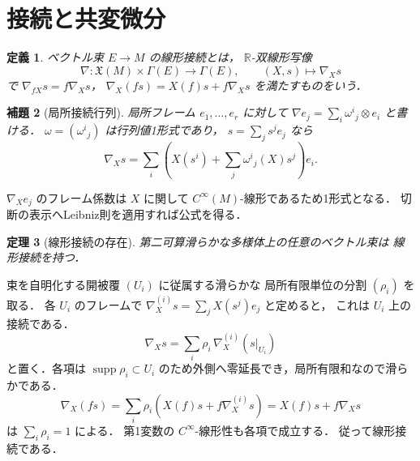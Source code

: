 \documentclass[a5paper,10pt,onecolumn]{jsarticle}
\makeatletter
\theoremstyle{mathnotetheorem}
\newtheorem{theorem}{定理}[section]
\newtheorem{definition}[theorem]{定義}
\newtheorem{lemma}[theorem]{補題}
\renewcommand{\proofname}{証明}
\renewenvironment{proof}[1][\proofname]{%
  \par\pushQED{\qed}\normalfont\topsep4\p@\@plus2\p@\relax
  \trivlist\item[\hskip\labelsep\bfseries #1]\ignorespaces
}{\popQED\endtrivlist\@endpefalse}
\makeatother
\begin{document}
\section{接続と共変微分}
\begin{definition}
ベクトル束 $E\to M$ の線形接続とは，
$\mathbb R$-双線形写像
\[
 \nabla:\mathfrak X(M)\times\Gamma(E)\to\Gamma(E),
 \qquad (X,s)\mapsto\nabla_Xs
\]
で
$\nabla_{fX}s=f\nabla_Xs$，
$\nabla_X(fs)=X(f)s+f\nabla_Xs$ を満たすものをいう．
\end{definition}
\begin{lemma}[局所接続行列]\label{lem:matrix}
局所フレーム $e_1,\dots,e_r$ に対して
$\nabla e_j=\sum_i\omega^i{}_j\otimes e_i$ と書ける．
$\omega=(\omega^i{}_j)$ は行列値1形式であり，
$s=\sum_js^je_j$ なら
\[
 \nabla_Xs=\sum_i\left(X(s^i)+
 \sum_j\omega^i{}_j(X)s^j\right)e_i.
\]
\end{lemma}
\begin{proof}
$\nabla_Xe_j$ のフレーム係数は $X$ に関して
$C^\infty(M)$-線形であるため1形式となる．
切断の表示へLeibniz則を適用すれば公式を得る．
\end{proof}
\begin{theorem}[線形接続の存在]\label{thm:exist}
第二可算滑らかな多様体上の任意のベクトル束は
線形接続を持つ．
\end{theorem}
\begin{proof}
束を自明化する開被覆 $(U_i)$ に従属する滑らかな
局所有限単位の分割 $(\rho_i)$ を取る．
各 $U_i$ のフレームで
$\nabla^{(i)}_Xs=\sum_jX(s^j)e_j$ と定めると，
これは $U_i$ 上の接続である．
\[
 \nabla_Xs=\sum_i\rho_i\,\nabla^{(i)}_X(s|_{U_i})
\]
と置く．各項は $\operatorname{supp}\rho_i\subset U_i$
のため外側へ零延長でき，局所有限和なので滑らかである．
\[
 \nabla_X(fs)=\sum_i\rho_i
 (X(f)s+f\nabla^{(i)}_Xs)
 =X(f)s+f\nabla_Xs
\]
は $\sum_i\rho_i=1$ による．
第1変数の $C^\infty$-線形性も各項で成立する．
従って線形接続である．
\end{proof}
\end{document}
